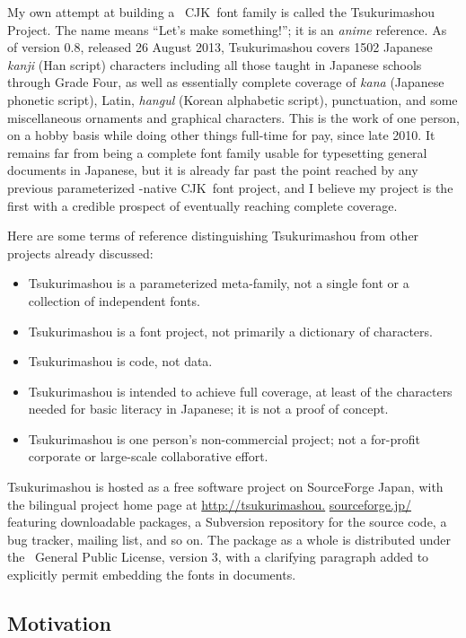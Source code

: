 \documentclass{ltugboat}
\def\CJK{CJK}
\begin{document}
My own attempt at building a \MF\ \CJK\ font family is called the
Tsukurimashou Project.  The name means ``Let's
make something!''; it is an \emph{anime} reference.  As of version 0.8,
released 26 August 2013, Tsukurimashou covers 1502 Japanese \emph{kanji}
(Han script) characters including all those taught in Japanese schools
through Grade Four, as well as essentially complete coverage of \emph{kana}
(Japanese phonetic script), Latin, \emph{hangul} (Korean alphabetic script),
punctuation, and some miscellaneous ornaments and graphical characters. 
This is the work of one person, on a hobby basis while doing other things
full-time for pay, since late 2010.  It remains far from being a complete
font family usable for typesetting general documents in Japanese, but it is
already far past the point reached by any previous parameterized \MF-native
\CJK\ font project, and I believe my project is the first with a credible
prospect of eventually reaching complete coverage.

Here are some terms of reference distinguishing Tsukurimashou from other
projects already discussed:
\begin{itemize}
\item Tsukurimashou is a parameterized meta-family, not a single font or
a collection of independent fonts.
\item Tsukurimashou is a font project, not primarily a dictionary of
characters.
\item Tsukurimashou is code, not data.
\item Tsukurimashou is intended to achieve full coverage, at least of the
characters needed for basic literacy in Japanese; it is not a
proof of concept.
\item Tsukurimashou is one person's non-commercial project; not a for-profit
corporate or large-scale collaborative effort.
\end{itemize}

Tsukurimashou is hosted as a free software
\linebreak%
 project on SourceForge Japan,
with the bilingual project home page at
\url{http://tsukurimashou.}
\linebreak%
\url{sourceforge.jp/} featuring downloadable packages,
a Subversion repository for the source code, a bug tracker, mailing list,
and so on.  The package as a whole is distributed under the \GNU\ General
Public License, version 3, with a clarifying paragraph added to explicitly
permit embedding the fonts in documents.

\subsection{Motivation}
\end{document}
